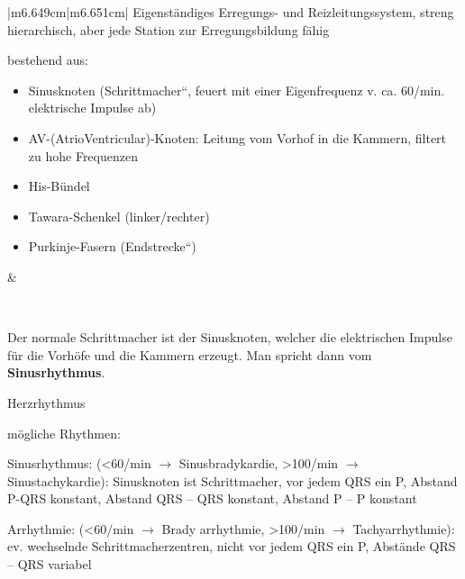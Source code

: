 \documentclass{article}
\newcommand\gEs[1]{\textbf{\textcolor[rgb]{0.0,0.0,0.5019608}{#1}}}
\newcommand\gEs[1]{\textbf{\textcolor[rgb]{0.0,0.0,0.5019608}{#1}}}
\newcommand\gZ[1]{\textcolor[rgb]{0.5019608,0.5019608,0.5019608}{#1}}
\begin{document}
\begin{center}
\tablehead{}\begin{supertabular}{|m{6.649cm}|m{6.651cm}|}
\hline
{\mdseries Eigenst\"andiges  Erregungs- und  Reizleitungssystem, streng
hierarchisch, aber jede  Station zur Erregungsbildung  f\"ahig }

{\mdseries bestehend aus:}

\begin{itemize}
\item {\mdseries Sinusknoten 
({\quotedblbase}Schrittmacher{\textquotedblleft}, feuert mit einer
Eigenfrequenz v. ca. 60/min. elektrische Impulse ab)}

\item {\mdseries AV-(AtrioVentricular)-Knoten: Leitung vom Vorhof in die
Kammern, filtert zu hohe Frequenzen}

\item {\mdseries \gZ{His-B\"undel}}

\item {\mdseries \gZ{Tawara-Schenkel (linker/rechter)}}

\item {\mdseries \gZ{Purkinje-Fasern
({\quotedblbase}Endstrecke{\textquotedblleft})}}

\end{itemize}
 &
{%
 \par}

\\\hline
\end{supertabular}
\end{center}
{\mdseries
Der normale Schrittmacher ist der Sinusknoten, welcher die elektrischen
Impulse f\"ur die Vorh\"ofe und die Kammern erzeugt. Man spricht dann
vom \gEs{Sinusrhythmus}.}

{\mdseries
\gZ{Herzrhythmus}}

{\mdseries
\gZ{m\"ogliche Rhythmen:}}

{\mdseries
\gZ{Sinusrhythmus: ({\textless}60/min ${\rightarrow}$
Sinusbradykardie, {\textgreater}100/min ${\rightarrow}$
Sinustachy\-kardie): Sinus\-knoten ist Schrittmacher, vor jedem QRS ein
P, Abstand P-QRS konstant, Abstand QRS }\gZ{{}-- QRS
konstant, Abstand P -- P konstant}}

{\mdseries
\gZ{Arrhythmie: ({\textless}60/min ${\rightarrow}$
Brady arrhythmie, {\textgreater}100/min ${\rightarrow}$
Tachyarrhythmie): ev. wechselnde Schrittmacherzentren, nicht vor jedem
QRS ein P, Abst\"ande QRS -- QRS variabel}}
\end{document}
